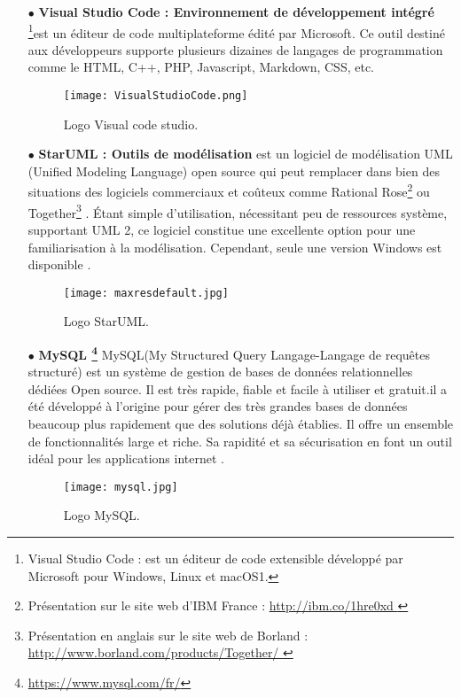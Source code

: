 \begin{itemize}
	\item[$\bullet$] \textbf{Visual Studio Code : Environnement de développement intégré } \footnote{Visual Studio Code : est un éditeur de code extensible développé par Microsoft pour Windows, Linux et macOS1.}est un éditeur de code multiplateforme édité par Microsoft. Ce outil destiné aux développeurs supporte plusieurs dizaines de langages de programmation comme le HTML, C++, PHP, Javascript, Markdown, CSS, etc. \cite{wiki:Visual_Studio_Code}
\begin{figure}[ht]
	\centering
	\texttt{[image: VisualStudioCode.png]}
	\caption{Logo Visual code studio.}
	\label{fig:VisualStudioCode }
\end{figure}
\FloatBarrier

\medskip

\item[$\bullet$] \textbf{StarUML : Outils de modélisation} 
est un logiciel de modélisation UML (Unified Modeling Language) open source qui peut remplacer dans bien des situations des logiciels commerciaux et coûteux comme Rational Rose\footnote{Présentation sur le site web d’IBM France :
\url{http://ibm.co/1hre0xd } } ou Together\footnote{Présentation en anglais sur le site web de Borland : \url{http://www.borland.com/products/Together/ }}
. Étant simple d’utilisation, nécessitant peu de
ressources système, supportant UML 2, ce logiciel constitue une excellente option pour une familiarisation à la modélisation. Cependant, seule une version Windows est disponible . \cite{wiki:StarUML} 
	\begin{figure}[ht]
		\centering
		\texttt{[image: maxresdefault.jpg]}
		\caption{Logo StarUML.}
		\label{fig:StarUML }
	\end{figure}
	\FloatBarrier
    \medskip


\item[$\bullet$] \textbf{MySQL \footnote{ \url{https://www.mysql.com/fr/} }} 
MySQL(My Structured Query Langage-Langage de requêtes structuré) est un système de
gestion de bases de données relationnelles dédiées Open source. Il est très rapide, fiable et facile à utiliser et gratuit.il a été développé à l’origine pour gérer des très grandes bases de données beaucoup plus rapidement que des solutions déjà établies. Il offre un ensemble de fonctionnalités large et riche. Sa rapidité et sa sécurisation en font un outil idéal pour les applications internet .\cite{wiki:MySQL} 
\begin{figure}[ht]
	\centering
	\texttt{[image: mysql.jpg]}
	\caption{Logo MySQL.}
	\label{fig:Logo MySQL }
\end{figure}
\FloatBarrier
\medskip

















\end{itemize}
